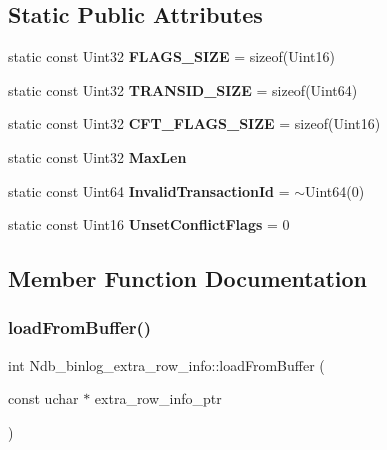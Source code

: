\subsection*{Static Public Attributes}
\begin{DoxyCompactItemize}
\item 
\mbox{\label{classNdb__binlog__extra__row__info_a2141bbc50c88bde0c4263251abb1d584}} 
static const Uint32 {\bfseries F\+L\+A\+G\+S\+\_\+\+S\+I\+ZE} = sizeof(Uint16)
\item 
\mbox{\label{classNdb__binlog__extra__row__info_ab18b0bbd8e82e1c6ce2cbcd3942993b0}} 
static const Uint32 {\bfseries T\+R\+A\+N\+S\+I\+D\+\_\+\+S\+I\+ZE} = sizeof(Uint64)
\item 
\mbox{\label{classNdb__binlog__extra__row__info_aac4a59a3df273f3a60b52cfa8f76870e}} 
static const Uint32 {\bfseries C\+F\+T\+\_\+\+F\+L\+A\+G\+S\+\_\+\+S\+I\+ZE} = sizeof(Uint16)
\item 
static const Uint32 {\bfseries Max\+Len}
\item 
\mbox{\label{classNdb__binlog__extra__row__info_aebcdf9e9c10415a1cb978d14c978fc55}} 
static const Uint64 {\bfseries Invalid\+Transaction\+Id} = $\sim$Uint64(0)
\item 
\mbox{\label{classNdb__binlog__extra__row__info_a29342fbcc7af5fb653d6ec2c51fcfe9e}} 
static const Uint16 {\bfseries Unset\+Conflict\+Flags} = 0
\end{DoxyCompactItemize}


\subsection{Member Function Documentation}
\mbox{\label{classNdb__binlog__extra__row__info_a5bbe4660bdabf94c12fe396c07803df3}} 
\subsubsection{\texorpdfstring{load\+From\+Buffer()}{loadFromBuffer()}}
{\footnotesize\ttfamily int Ndb\+\_\+binlog\+\_\+extra\+\_\+row\+\_\+info\+::load\+From\+Buffer (\begin{DoxyParamCaption}\item[{const uchar $\ast$}]{extra\+\_\+row\+\_\+info\+\_\+ptr }\end{DoxyParamCaption})}

